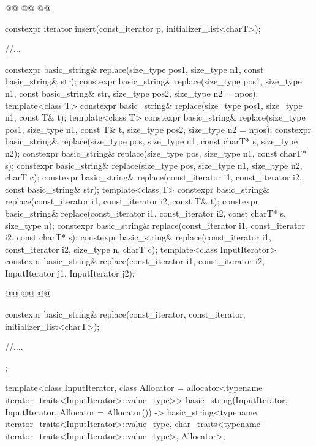 \documentclass{wg21}
\begin{document}
\begin{codeblock}
{{        @@
        @@
        @@
        
        constexpr iterator insert(const_iterator p, initializer_list<charT>);
        
        //...
        
        constexpr basic_string& replace(size_type pos1, size_type n1, const basic_string& str);
        constexpr basic_string& replace(size_type pos1, size_type n1, const basic_string& str,
        size_type pos2, size_type n2 = npos);
        template<class T>
        constexpr basic_string& replace(size_type pos1, size_type n1, const T& t);
        template<class T>
        constexpr basic_string& replace(size_type pos1, size_type n1, const T& t,
        size_type pos2, size_type n2 = npos);
        constexpr basic_string& replace(size_type pos, size_type n1, const charT* s, size_type n2);
        constexpr basic_string& replace(size_type pos, size_type n1, const charT* s);
        constexpr basic_string& replace(size_type pos, size_type n1, size_type n2, charT c);
        constexpr basic_string& replace(const_iterator i1, const_iterator i2,
        const basic_string& str);
        template<class T>
        constexpr basic_string& replace(const_iterator i1, const_iterator i2, const T& t);
        constexpr basic_string& replace(const_iterator i1, const_iterator i2, const charT* s,
        size_type n);
        constexpr basic_string& replace(const_iterator i1, const_iterator i2, const charT* s);
        constexpr basic_string& replace(const_iterator i1, const_iterator i2, size_type n, charT c);
        template<class InputIterator>
        constexpr basic_string& replace(const_iterator i1, const_iterator i2, 
            InputIterator j1, InputIterator j2);
        
        @@
        @@
        @@
        
        constexpr basic_string& replace(const_iterator, const_iterator, initializer_list<charT>);
        
        //....
    };
    
    template<class InputIterator,
    class Allocator = allocator<typename iterator_traits<InputIterator>::value_type>>
    basic_string(InputIterator, InputIterator, Allocator = Allocator())
    -> basic_string<typename iterator_traits<InputIterator>::value_type,
    char_traits<typename iterator_traits<InputIterator>::value_type>,
    Allocator>;
    
}
\end{codeblock}
\end{document}
